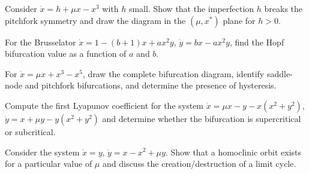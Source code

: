 \begin{exercise}
Consider $\dot{x} = h + \mu x - x^3$ with $h$ small. Show that the
imperfection $h$ breaks the pitchfork symmetry and draw the diagram in the
$(\mu, x^*)$ plane for $h > 0$.
\end{exercise}

\begin{exercise}
For the Brusselator $\dot{x} = 1 - (b+1)x + ax^2y$,
$\dot{y} = bx - ax^2y$, find the Hopf bifurcation value as a function of
$a$ and $b$.
\end{exercise}

\begin{exercise}
For $\dot{x} = \mu x + x^3 - x^5$, draw the complete bifurcation diagram,
identify saddle-node and pitchfork bifurcations, and determine the presence
of hysteresis.
\end{exercise}

\begin{exercise}
Compute the first Lyapunov coefficient for the system
$\dot{x} = \mu x - y - x(x^2 + y^2)$,
$\dot{y} = x + \mu y - y(x^2 + y^2)$
and determine whether the bifurcation is supercritical or subcritical.
\end{exercise}

\begin{exercise}
Consider the system $\dot{x} = y$, $\dot{y} = x - x^2 + \mu y$. Show that
a homoclinic orbit exists for a particular value of $\mu$ and discuss the
creation/destruction of a limit cycle.
\end{exercise}
